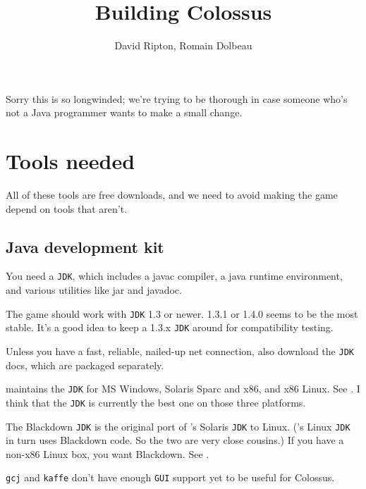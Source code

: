 \documentclass{article}
\begin{document}

\title{Building Colossus}

\author{David Ripton, Romain Dolbeau}

\maketitle

Sorry this is so longwinded; we're trying to be thorough in case 
someone who's not a Java programmer wants to make a small change.

\section{Tools needed}

All of these tools are free downloads, and we need to avoid making 
the game depend on tools that aren't.

\subsection{Java development kit}

You need a \texttt{JDK}, which includes a javac compiler, a java runtime
environment,  and various utilities like jar and javadoc.

The game should work with \texttt{JDK} 1.3 or newer. 1.3.1 or 1.4.0 seems to be
the most stable.  It's a good idea to keep a 1.3.x \texttt{JDK} around for 
compatibility testing.

Unless you have a fast, reliable, nailed-up net connection, also 
download the \texttt{JDK} docs, which are packaged separately.

 maintains the \texttt{JDK}
for MS Windows, Solaris Sparc and x86, and x86 Linux. See
. I think that the
 \texttt{JDK} is currently
the best one on those three platforms.

The Blackdown \texttt{JDK} is the original port of
's Solaris \texttt{JDK}
to Linux. ('s Linux
\texttt{JDK} in turn uses Blackdown code. So the two are very close cousins.)
If you have a non-x86 Linux box, you want Blackdown. See
.

\texttt{gcj} and \texttt{kaffe} don't have enough \texttt{GUI} support yet to
be useful for Colossus.
\end{document}
